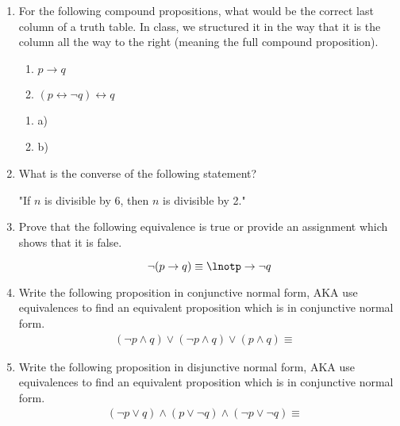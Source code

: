 \documentclass[letterpaper,12pt]{article}
\theoremstyle{plain}
\theoremstyle{definition}
\theoremstyle{remark}
\providecommand{\land}{\ensuremath{\wedge}}
\providecommand{\lor}{\ensuremath{\vee}}
\begin{document}
\pagestyle{fancy}


\begin{enumerate}
\item
  For the following compound propositions, what would be the correct last column of a truth table. In class, we structured it in the way that it is the column all the way to the right (meaning the full compound proposition). 
  \begin{enumerate}
    \item $p \to q$
    \item $(p\leftrightarrow \lnot q) \leftrightarrow q$
  \end{enumerate}
 

 
\begin{enumerate}
\item a) 
\item b) 
\end{enumerate}
\item What is the converse of the following statement?

"If $n$ is divisible by 6, then $n$ is divisible by 2."


\item Prove that the following equivalence is true or provide an assignment which shows that it is false.

\[\lnot(p\to q) \equiv \lnotp \to \lnot q \]

\item Write the following proposition in conjunctive normal form, AKA use equivalences to find an equivalent proposition which is in conjunctive normal form. 
\begin{align}
(\lnot p\land q) \lor (\lnot p \land q) \lor (p \land q)\equiv&
\end{align}

\item Write the following proposition in disjunctive normal form, AKA use equivalences to find an equivalent proposition which is in conjunctive normal form.
\begin{align}
(\lnot p \lor q) \land ( p \lor \lnot q) \land (\lnot p \lor \lnot q )\equiv&
\end{align}





\end{enumerate}
\end{document}
